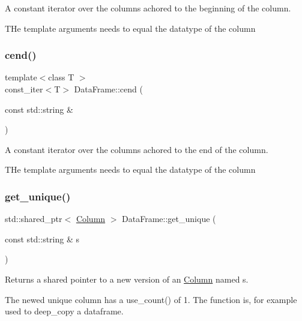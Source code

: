 A constant iterator over the columns achored to the beginning of the column. 

T\+He template arguments needs to equal the datatype of the column \mbox{\label{classDataFrame_a895c45b1be67d772aed3fa10169a1038}} 
\subsubsection{\texorpdfstring{cend()}{cend()}}
{\footnotesize\ttfamily template$<$class T $>$ \\
const\+\_\+iter$<$T$>$ Data\+Frame\+::cend (\begin{DoxyParamCaption}\item[{const std\+::string \&}]{ }\end{DoxyParamCaption})}



A constant iterator over the columns achored to the end of the column. 

T\+He template arguments needs to equal the datatype of the column \mbox{\label{classDataFrame_a5909652f24e66c22922b4b4c910f2b09}} 
\subsubsection{\texorpdfstring{get\+\_\+unique()}{get\_unique()}}
{\footnotesize\ttfamily std\+::shared\+\_\+ptr$<$ \hyperlink{classColumn}{Column} $>$ Data\+Frame\+::get\+\_\+unique (\begin{DoxyParamCaption}\item[{const std\+::string \&}]{s }\end{DoxyParamCaption})}



Returns a shared pointer to a new version of an \hyperlink{classColumn}{Column} named s. 

The newed unique column has a use\+\_\+count() of 1. The function is, for example used to deep\+\_\+copy a dataframe. \mbox{\label{classDataFrame_a40f6420c823601946d56ba625484a74e}} 
